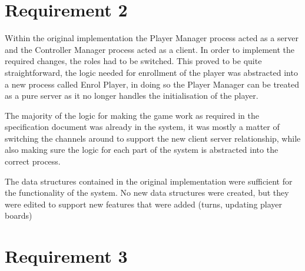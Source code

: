\documentclass[10pt, a4paper]{article}
\title{\mytitle}
\author{\myauthor\hspace{1em}\\\contact\\Edinburgh Napier University\hspace{0.5em}-\hspace{0.5em}\mymodule}
\date{}
\begin{document}
	\maketitle	
	
	
	\section{Requirement 2}
	

	
	Within the original implementation the Player Manager process acted as a server and the Controller Manager process acted as a client. In order to implement the required changes, the roles had to be switched. This proved to be quite straightforward, the logic needed for enrollment of the player was abstracted into a new process called Enrol Player, in doing so the Player Manager can be treated as a pure server as it no longer handles the initialisation of the player. 
	
	The majority of the logic for making the game work as required in the specification document was already in the system, it was mostly a matter of switching the channels around to support the new client server relationship, while also making sure the logic for each part of the system is abstracted into the correct process.

	The data structures contained in the original implementation were sufficient for the functionality of the system. No new data structures were created, but they were edited to support new features that were added (turns, updating player boards)
	
	
	
	
	
	
	\section{Requirement 3}
	
\end{document}
